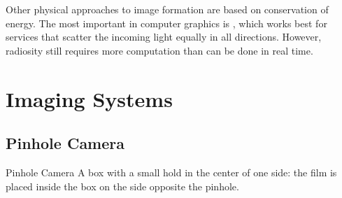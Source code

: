 \documentclass[\main/notes.tex]{subfiles}
\begin{document}
        Other physical approaches to image formation are based on conservation of energy.
        The most important in computer graphics is ,
        which works best for services that scatter the incoming light equally in all directions.
        However, radiosity still requires more computation than can be done in real time.

    \section{Imaging Systems}
      \subsection{Pinhole Camera}
        \begin{definition}{Pinhole Camera}
          A box with a small hold in the center of one side:
          the film is placed inside the box on the side opposite the pinhole.
        \end{definition}
\end{document}
